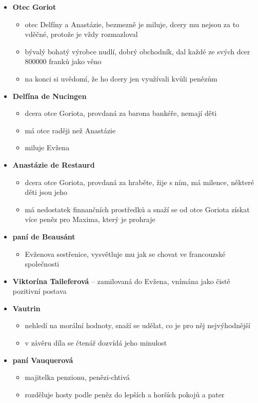 \documentclass[10pt,a4paper]{article}
\begin{document}
\begin{itemize}
\item \textbf{Otec Goriot} 
	\begin{itemize}
	\item otec Delfíny a Anastázie, bezmezně je miluje, dcery mu nejsou za to vděčné, protože je vždy rozmazloval
	\item bývalý bohatý výrobce nudlí, dobrý obchodník, dal každé ze svých dcer 800000 franků jako věno
	\item na konci si uvědomí, že ho dcery jen využívali kvůli penězům
	\end{itemize}
\item \textbf{Delfína de Nucingen} 
	\begin{itemize}
	\item dcera otce Goriota, provdaná za barona bankéře, nemají děti
	\item má otce raději než Anastázie
	\item miluje Evžena
	\end{itemize}	 
\item \textbf{Anastázie de Restaurd}
	\begin{itemize}
	\item dcera otce Goriota, provdaná za hraběte, žije s ním, má milence, některé děti jsou jeho
	\item má nedostatek finnančních prostředků a snaží se od otce Goriota získat více peněz pro Maxima, který je prohraje
	\end{itemize}
\item \textbf{paní de Beausánt}
	\begin{itemize}
	\item Evženova sestřenice, vysvětluje mu jak se chovat ve francouzské společnosti
	\end{itemize}
\item \textbf{Viktorína Taileferová} -- zamilovaná do Evžena, vnímána jako čistě pozitivní postava
\item \textbf{Vautrin}
	\begin{itemize}
	\item nehledí na morální hodnoty, snaží se udělat, co je pro něj nejvýhodnější
	\item v závěru díla se čtenář dozvídá jeho minulost
	\end{itemize}	 
\item \textbf{paní Vauquerová}
	\begin{itemize}
	\item majitelka penzionu, penězi-chtivá
	\item rozděluje hosty podle peněz do lepších a horších pokojů a pater
	\end{itemize}
\end{itemize}
\end{document}
